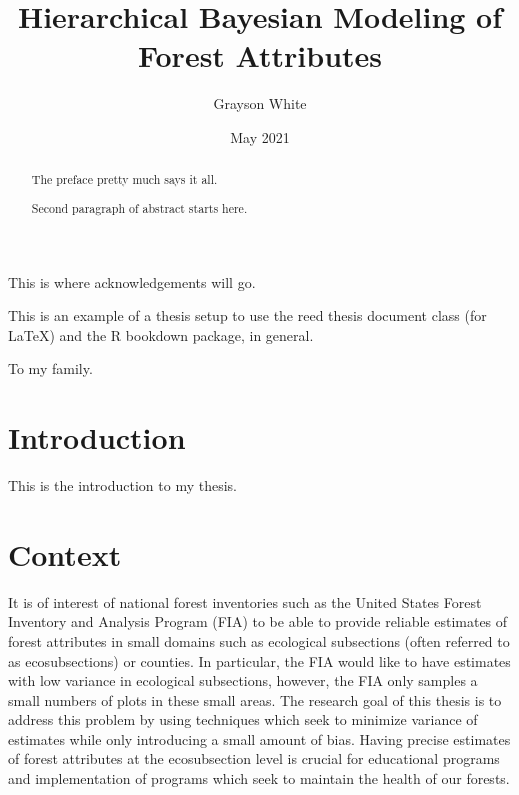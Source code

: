 \documentclass[12pt,twoside]{reedthesis}
\title{Hierarchical Bayesian Modeling of Forest Attributes}
\author{Grayson White}
\date{May 2021}
\begin{document}
  \maketitle

\frontmatter %
\pagestyle{empty} %
  \begin{acknowledgements}
    This is where acknowledgements will go.
  \end{acknowledgements}
  \begin{preface}
    This is an example of a thesis setup to use the reed thesis document class
    (for LaTeX) and the R bookdown package, in general.
  \end{preface}
  \hypersetup{linkcolor=black}
  \setcounter{tocdepth}{2}
  \tableofcontents

  \listoftables

  \listoffigures
  \begin{abstract}
    The preface pretty much says it all.
    
    \par
    
    Second paragraph of abstract starts here.
  \end{abstract}
  \begin{dedication}
    To my family.
  \end{dedication}
\mainmatter %
\pagestyle{fancyplain} %

\hypertarget{introduction}{%
\chapter*{Introduction}\label{introduction}}

This is the introduction to my thesis.

\hypertarget{context}{%
\chapter{Context}\label{context}}

It is of interest of national forest inventories such as the United States Forest Inventory and Analysis Program (FIA) to be able to provide reliable estimates of forest attributes in small domains such as ecological subsections (often referred to as ecosubsections) or counties. In particular, the FIA would like to have estimates with low variance in ecological subsections, however, the FIA only samples a small numbers of plots in these small areas. The research goal of this thesis is to address this problem by using techniques which seek to minimize variance of estimates while only introducing a small amount of bias. Having precise estimates of forest attributes at the ecosubsection level is crucial for educational programs and implementation of programs which seek to maintain the health of our forests.
\end{document}
